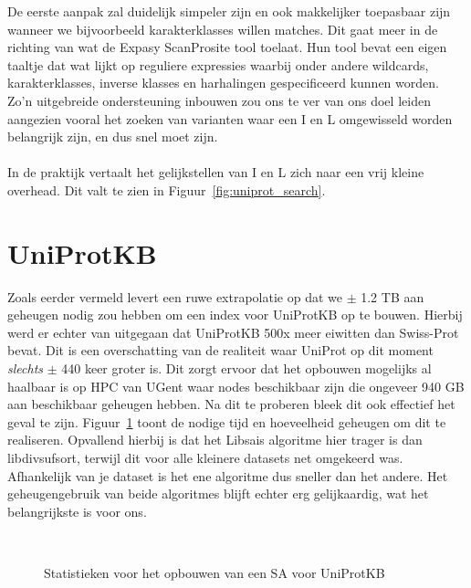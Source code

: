 De eerste aanpak zal duidelijk simpeler zijn en ook makkelijker toepasbaar zijn wanneer we bijvoorbeeld karakterklasses willen matches.
Dit gaat meer in de richting van wat de Expasy ScanProsite tool\cite{scanprosite} toelaat.
Hun tool bevat een eigen taaltje dat wat lijkt op reguliere expressies waarbij onder andere wildcards, karakterklasses, inverse klasses en harhalingen gespecificeerd kunnen worden.
Zo'n uitgebreide ondersteuning inbouwen zou ons te ver van ons doel leiden aangezien vooral het zoeken van varianten waar een I en L omgewisseld worden belangrijk zijn, en dus snel moet zijn.
\\ \\
In de praktijk vertaalt het gelijkstellen van I en L zich naar een vrij kleine overhead.
Dit valt te zien in Figuur~\ref{fig:uniprot_search}.

\section{UniProtKB}
Zoals eerder vermeld levert een ruwe extrapolatie op dat we $\pm$ 1.2 TB aan geheugen nodig zou hebben om een index voor UniProtKB op te bouwen.
Hierbij werd er echter van uitgegaan dat UniProtKB 500x meer eiwitten dan Swiss-Prot bevat.
Dit is een overschatting van de realiteit waar UniProt op dit moment \textit{slechts} $\pm$ 440 keer groter is.
Dit zorgt ervoor dat het opbouwen mogelijks al haalbaar is op HPC van UGent waar nodes beschikbaar zijn die ongeveer 940 GB aan beschikbaar geheugen hebben.
Na dit te proberen bleek dit ook effectief het geval te zijn.
Figuur~\ref{fig:build_uniprot} toont de nodige tijd en hoeveelheid geheugen om dit te realiseren.
Opvallend hierbij is dat het Libsais algoritme hier trager is dan libdivsufsort, terwijl dit voor alle kleinere datasets net omgekeerd was.
Afhankelijk van je dataset is het ene algoritme dus sneller dan het andere.
Het geheugengebruik van beide algoritmes blijft echter erg gelijkaardig, wat het belangrijkste is voor ons.
\\
\begin{figure}[H]
    \centering
    \\[4ex] %

    \caption{Statistieken voor het opbouwen van een SA voor UniProtKB}\label{fig:build_uniprot}
\end{figure}


